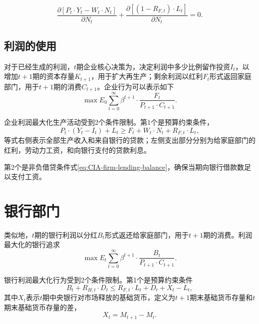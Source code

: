 \begin{equation}
  \label{CIA-firm-optim-partial}
  \frac{\partial \left[ P_t \cdot Y_t - W_t \cdot N_t \right]}{\partial N_t} + \frac{\partial \left[ (1-R_{F,t}) \cdot L_t \right]}{\partial N_t} = 0.
\end{equation}


\subsection{利润的使用}
对于已经生成的利润，$t$期企业核心决策为，决定利润中多少比例留作投资$I_t$，以增加$t+1$期的资本存量$K_{t+1}$，用于扩大再生产；剩余利润以红利$F_t$形式返回家庭部门，用于$t+1$期的消费$C_{t+1}$。企业行为可以表示如下
\begin{equation}
  \label{CIA-firm-max-problem}
  \max E_0 \sum_{t=0}^{\infty} \beta^{t+1} \cdot \frac{F_t}{P_{t+1} \cdot C_{t+1}}.
\end{equation}

企业利润最大化生产活动受到2个条件限制。第1个是预算约束条件，
\begin{equation}
  \label{eq:CIA-firm-budget-constraint}
  P_t \cdot (Y_t-I_t) + L_t \ge F_t + W_t \cdot N_t + R_{F,t} \cdot L_t,
\end{equation}
等式右侧表示全部生产收入和来自银行的贷款；左侧支出部分分别为给家庭部门的红利，劳动力工资，和向银行支付的贷款利息。

第2个是非负借贷条件式\eqref{eq:CIA-firm-lending-balance}，确保当期向银行借款数足以支付工资。

\section{银行部门}
类似地，$t$期的银行利润以分红$B_t$形式返还给家庭部门，用于$t+1$期的消费。利润最大化的银行追求
\begin{equation}
  \label{eq:CIA-bank-max-problem}
  \max E_t \sum_{t=0}^{\infty} \beta^{t+1} \cdot \frac{B_{t}}{P_{t+1} \cdot C_{t+1}}.
\end{equation}

银行利润最大化行为受到2个条件限制。第1个是预算约束条件
\begin{equation}
  \label{eq:CIA-bank-budget-constraint}
  B_t + R_{H,t} \cdot D_t \le R_{F,t} \cdot L_t + D_t + X_t - L_t,
\end{equation}
其中$X_t$表示$t$期中央银行对市场释放的基础货币，定义为$t+1$期末基础货币存量和$t$期末基础货币存量的差，
\begin{equation}
  \label{eq:CIA-central-bank-money-injection}
  X_t = M_{t+1} - M_t.
\end{equation}

